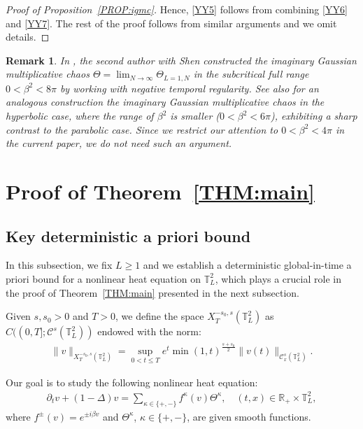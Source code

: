 \documentclass[letterpaper, 11pt,  reqno]{amsart}
\theoremstyle{myremark}
\newtheorem{remark}[theorem]{Remark}
\newcommand{\Ta}{\Theta}
\newcommand{\1}{\hspace{0.5mm}\text{I}\hspace{0.5mm}}
\newcommand{\R}{\mathbb{R}}
\newcommand{\T}{\mathbb{T}}
\newcommand{\CC}{\mathcal{C}}
\newcommand{\be}{\beta}
\newcommand{\Dl}{\Delta}
\newcommand{\kk}{\kappa}
\newcommand{\dt}{\partial_t}
\numberwithin{equation}{section}
\numberwithin{theorem}{section}
\begin{document}
\begin{proof}[Proof of Proposition~\ref{PROP:igmc}]
Hence, \eqref{YY5} follows from combining \eqref{YY6} and \eqref{YY7}. The rest of the proof follows from similar arguments and we omit details.
\end{proof}

\begin{remark}
In \cite{HS}, 
the second author with Shen constructed the imaginary Gaussian multiplicative chaos  $\Ta
= \lim_{N \to \infty} \Ta_{L = 1, N}$ in the 
subcritical full range $0 < \be^2 < 8\pi$ by 
working with negative temporal regularity.
See also \cite{OZ}
for an analogous construction
the imaginary Gaussian multiplicative chaos 
 in 
 the hyperbolic case, 
 where   the range of $\be^2$ is smaller ($0 < \be^2 < 6\pi$), 
 exhibiting a sharp contrast to the parabolic case.
 Since we restrict our attention to $0 < \be^2 < 4\pi$ in the current paper, 
we do not need such an argument.
\end{remark}
\section{Proof of Theorem~\ref{THM:main}}\label{SEC:proof}

\subsection{Key deterministic a priori bound}
In this subsection, we fix $L\ge 1$ and
we establish a deterministic global-in-time a priori bound
for a nonlinear heat equation on $\T^2_L$, 
which plays a crucial role in the proof of Theorem~\ref{THM:main}
presented in the next subsection.




Given  $s,s_0>0$
and $T > 0$, 
we define the space $X^{-s_0,s}_T(\T_L^2)$ as $ C((0,T]; \CC^{s}(\T_L^2))$ endowed with the norm:
\begin{align}
\|v\|_{X^{-s_0,s}_T(\T^2_L)} = \sup_{0<t\le T} e^t \min(1,t)^{\frac{s+s_0}{2}} \|v(t)\|_{\CC_x^s(\T^2_L)}.
\label{XX0}
\end{align}

Our goal is to study the following nonlinear heat equation:
\begin{align}
\dt v + (1- \Dl) v = \sum_{\kk \in \{+, -\}} f^\kk(v) \Ta^\kk , \quad (t,x) \in \R_+ \times \T^2_L,
\label{heat1}
\end{align}
where $f^\pm(v) = e^{\pm i \be v}$
and $\Ta^\kk$, $\kk \in \{+, -\}$, 
are given smooth functions.
\end{document}
